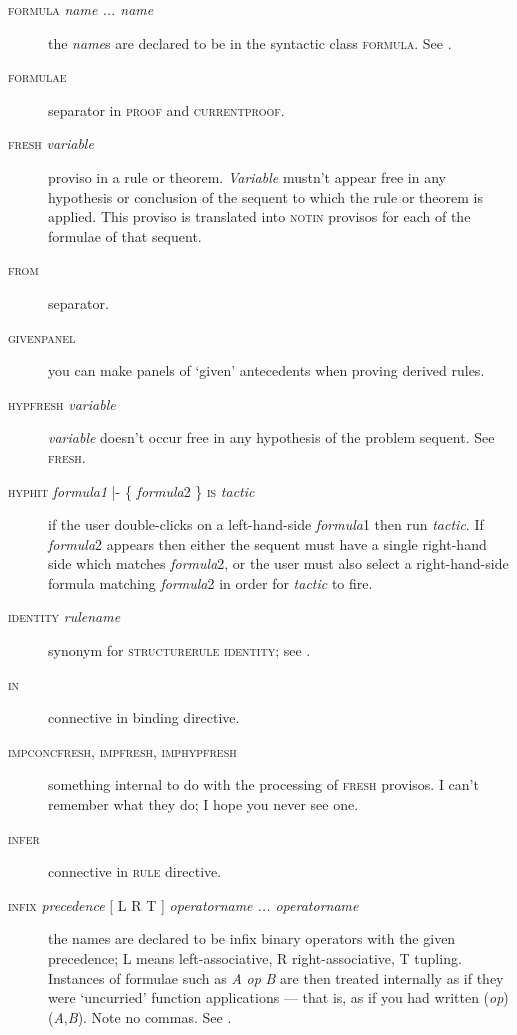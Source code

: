 \begin{description}
\item[\textsc{formula} \textit{name ... name}] the \textit{name}s are declared to be in the syntactic class \textsc{formula}. See .

\item[\textsc{formulae}] separator in \textsc{proof} and \textsc{currentproof}.

\item[\textsc{fresh} \textit{variable}] proviso in a rule or theorem. \textit{Variable} mustn't appear free in any hypothesis or conclusion of the sequent to which the rule or theorem is applied. This proviso is translated into \textsc{notin} provisos for each of the formulae of that sequent.

\item[\textsc{from}] separator.

\item[\textsc{givenpanel}] you can make panels of `given' antecedents when proving derived rules.

\item[\textsc{hypfresh} \textit{variable}] \textit{variable} doesn't occur free in any hypothesis of the problem sequent. See \textsc{fresh.}

\item[\textsc{hyphit} \textit{formula1} |- \{ \textit{formula}2 \} \textsc{is} \textit{tactic}] if the user double-clicks on a left-hand-side \textit{formula}1 then run \textit{tactic}. If \textit{formula}2 appears then either the sequent must have a single right-hand side which matches \textit{formula}2, or the user must also select a right-hand-side formula matching \textit{formula}2 in order for \textit{tactic} to fire.

\item[\textsc{identity} \textit{rulename}] synonym for \textsc{structurerule} \textsc{identity}; see .

\item[\textsc{in}] connective in binding directive.

\item[\textsc{impconcfresh}, \textsc{impfresh}, \textsc{imphypfresh}] something internal to do with the processing of \textsc{fresh} provisos. I can't remember what they do; I hope you never see one.

\item[\textsc{ infer }] connective in \textsc{rule} directive.

\item[\textsc{infix} \textit{precedence} \textsc{[} L {\textbar} R {\textbar} T \textsc{]} \textit{operatorname ... operatorname}] the names are declared to be infix binary operators with the given precedence; L means left-associative, R right-associative, T tupling. Instances of formulae such as \textit{A} \textit{op} \textit{B} are then treated internally as if they were `uncurried' function applications --- that is, as if you had written (\textit{op})(\textit{A},\textit{B}). Note no commas. See .


\end{description}
